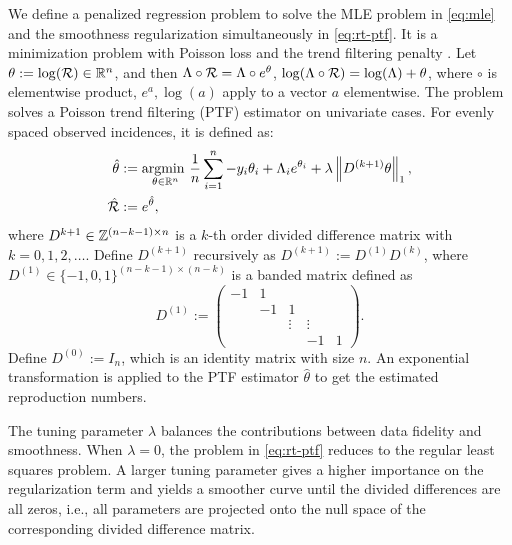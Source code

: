 We define a penalized regression problem to solve the MLE problem in \eqref{eq:mle} and the smoothness regularization simultaneously in \ref{eq:rt-ptf}. It is a minimization problem with Poisson loss and the trend filtering penalty \citep{kim2009ell_1,tibshirani2014adaptive,sadhanala2022exponential}. 
Let $\theta := \log(\mathcal{R}) \in \mathbb{R}^n$, and then $\Lambda\circ \mathcal{R} = \Lambda\circ e^{\theta}$, $\log(\Lambda\circ \mathcal{R}) = \log(\Lambda) + \theta$, where $\circ$ is elementwise product, $e^{a}, \log(a)$ apply to a vector $a$ elementwise. 
The problem solves a Poisson trend filtering (PTF) estimator on univariate cases. For evenly spaced observed incidences, it is defined as: 
\begin{equation} \label{eq:rt-ptf}
    \begin{split}
        \hat{\theta} &:= \underset{\theta\in\mathbb{R}^n}{\operatorname*{argmin}\ } \frac{1}{n}\sum_{i=1}^n -y_i \theta_i + \Lambda_i e^{\theta_i} + \lambda \left\lVert D^{(k+1)} \theta \right\rVert_1, \\
        \hat{\mathcal{R}} &:= e^{\hat{\theta}},
    \end{split}
\end{equation}
where $D^{k+1} \in \mathbb{Z}^{(n-k-1)\times n}$ is a $k$-th order divided difference matrix with $k = 0,1,2,\dots$. Define $D^{(k+1)}$ recursively as $D^{(k+1)} := D^{(1)} D^{(k)}$, where $D^{(1)} \in \{-1,0,1\}^{(n-k-1)\times (n-k)}$ is a banded matrix defined as
$$D^{(1)} := 
\begin{pmatrix}
-1 & 1 &  & & \\
 & -1 & 1 & & \\
 & & \vdots & \vdots & \\
 & & & -1 & 1
\end{pmatrix}.
$$
Define $D^{(0)} := I_n$, which is an identity matrix with size $n$. An exponential transformation is applied to the PTF estimator $\hat{\theta}$ to get the estimated reproduction numbers. 

The tuning parameter $\lambda$ balances the contributions between data fidelity and smoothness. When $\lambda=0$, the problem in \eqref{eq:rt-ptf} reduces to the regular least squares problem. A larger tuning parameter gives a higher importance on the regularization term and yields a smoother curve until the divided differences are all zeros, i.e., all parameters are projected onto the null space of the corresponding divided difference matrix. 

